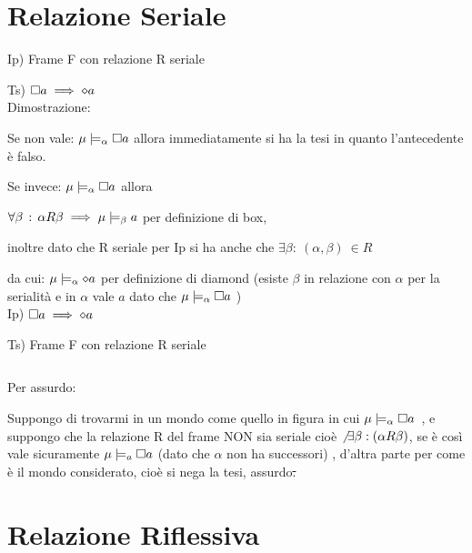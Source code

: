 \section{Relazione Seriale}

Ip) Frame F con relazione R seriale

Ts) $\square a\implies\diamond a$\\


Dimostrazione:

Se non vale: $\mu\models_{\alpha}\square a$ allora immediatamente si
ha la tesi in quanto l'antecedente è falso.

Se invece: $\mu\models_{\alpha}\square a$ allora

$\forall\beta\,:\,\alpha R\beta\implies\mu\models_{\beta}a$ per definizione
di box,

inoltre dato che R seriale per Ip si ha anche che $\exists\beta:\:(\alpha,\beta)\:\in R$

da cui: $\mu\models_{\alpha}\diamond a$ per definizione di diamond (esiste
$\beta$ in relazione con $\alpha$ per la serialità e in $\alpha$
vale $a$ dato che $\mu\models_{\alpha}\square a$ )\\


Ip) $\square a\implies\diamond a$

Ts) Frame F con relazione R seriale

\begin{center}
$ $\begin{center}  
 \end{center}
\par\end{center}

Per assurdo:

Suppongo di trovarmi in un mondo come quello in figura in cui \mbox{$\mu\models_{\alpha}\square a$
}, e suppongo che la relazione R del frame NON sia seriale cioè $\not\,\exists\beta:(\alpha R\beta)$,
se è così vale sicuramente $\mu\models_{a}\square a$ (dato che $\alpha$
non ha successori) , d'altra parte per come è il mondo considerato,
cioè si nega la tesi, assurdo\sout{.}


\section{Relazione Riflessiva}

